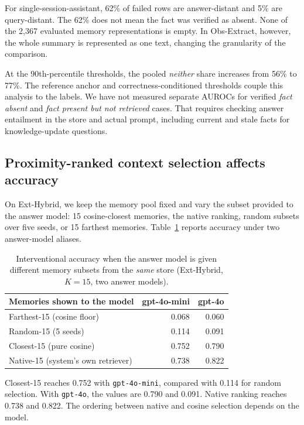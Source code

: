 \documentclass{article}
\begin{document}
For single-session-assistant, 62\% of failed rows are answer-distant and
5\% are query-distant. The 62\% does not mean the fact was verified as absent.
None of the 2{,}367 evaluated memory representations is empty.
In Obs-Extract, however, the whole summary is represented as one text,
changing the granularity of the comparison.

At the 90th-percentile thresholds, the pooled \emph{neither} share
increases from 56\% to 77\%.
The reference anchor and correctness-conditioned thresholds couple this
analysis to the labels.
We have not measured separate AUROCs for verified
\emph{fact absent} and \emph{fact present but not retrieved} cases.
That requires checking answer entailment in the store and actual prompt,
including current and stale facts for knowledge-update questions.

\subsection{Proximity-ranked context selection affects accuracy}
\label{sec:causal}

On Ext-Hybrid, we keep the memory pool fixed and vary the subset provided
to the answer model: 15 cosine-closest memories, the native ranking,
random subsets over five seeds, or 15 farthest memories.
Table~\ref{tab:causal} reports accuracy under two answer-model aliases.

\begin{table}[h]
  \centering\small
  \caption{Interventional accuracy when the answer model is given different memory
  subsets from the \emph{same} store (Ext-Hybrid, $K{=}15$, two answer models).}
  \label{tab:causal}
  \begin{tabular}{lrr}
    \toprule
    Memories shown to the model & gpt-4o-mini & gpt-4o \\
    \midrule
    Farthest-15 (cosine floor)         & 0.068 & 0.060 \\
    Random-15 (5 seeds)                & 0.114 & 0.091 \\
    Closest-15 (pure cosine)           & 0.752 & 0.790 \\
    Native-15 (system's own retriever) & 0.738 & 0.822 \\
    \bottomrule
  \end{tabular}
\end{table}

Closest-15 reaches 0.752 with \texttt{gpt-4o-mini}, compared with
0.114 for random selection. With \texttt{gpt-4o}, the values are 0.790 and 0.091.
Native ranking reaches 0.738 and 0.822.
The ordering between native and cosine selection depends on the model.
\end{document}
